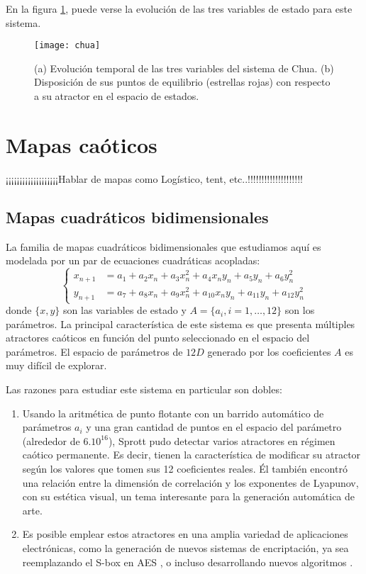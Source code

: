 En la figura \ref{fig:chua}, puede verse la evolución de las tres variables de estado para este sistema.
%
\begin{figure}
\centering\texttt{[image: chua]}
\caption{(a) Evolución temporal de las tres variables del sistema de Chua. (b) Disposición de sus puntos de equilibrio (estrellas rojas) con respecto a su atractor en el espacio de estados.}
\label{fig:chua}
\end{figure}

\section{Mapas caóticos}

¡¡¡¡¡¡¡¡¡¡¡¡¡¡¡¡¡¡¡Hablar de mapas como Logístico, tent, etc..!!!!!!!!!!!!!!!!!!!!

\subsection{Mapas cuadráticos bidimensionales}
\label{ssec:QMaps}

La familia de mapas cuadráticos bidimensionales que estudiamos aquí es modelada por un par de ecuaciones cuadráticas acopladas:
%
\begin{equation}\label{eq:mapaSprott}
\left\{\begin{aligned}
x_{n+1}&=a_1+a_2 x_n+a_3 x_n^2+a_4 x_n y_n+a_5 y_n+a_6 y_n^2\\
y_{n+1}&=a_7+a_8 x_n+a_9 x_n^2+a_{10} x_n y_n+a_{11} y_n+a_{12} y_n^2
\end{aligned}
\right.
\end{equation}
%
donde $\{x, y\}$ son las variables de estado y $A = \{a_i, i = 1, \dots, 12 \}$ son los parámetros.
La principal característica de este sistema es que presenta múltiples atractores caóticos en función del punto seleccionado en el espacio del parámetros.
El espacio de parámetros de $12D$ generado por los coeficientes $A$ es muy difícil de explorar.

Las razones para estudiar este sistema en particular son dobles:
%
\begin{enumerate}
	\item Usando la aritmética de punto flotante con un barrido automático de parámetros $a_i$ y una gran cantidad de puntos en el espacio del parámetro (alrededor de $6. 10 ^ {16}$), Sprott pudo detectar varios atractores en régimen caótico permanente.
	Es decir, tienen la característica de modificar su atractor según los valores que tomen sus 12 coeficientes reales.
	Él también encontró una relación entre la dimensión de correlación y los exponentes de Lyapunov, con su estética visual, un tema interesante para la generación automática de arte.
	\item Es posible emplear estos atractores en una amplia variedad de aplicaciones electrónicas, como la generación de nuevos sistemas de encriptación, ya sea reemplazando el S-box en AES \cite{Ahmad2013, Hussain2013}, o incluso desarrollando nuevos algoritmos \cite{Machado2004, Smaoui2009}.
\end{enumerate}

